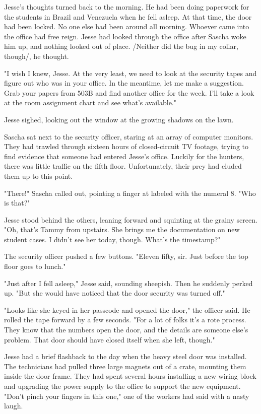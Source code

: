 Jesse's thoughts turned back to the morning.  He had been doing paperwork for the students in Brazil and Venezuela when he fell asleep.  At that time, the door had been locked.  No one else had been around all morning.  Whoever came into the office had free reign.  Jesse had looked through the office after Sascha woke him up, and nothing looked out of place.  /Neither did the bug in my collar, though/, he thought.

"I wish I knew, Jesse.  At the very least, we need to look at the security tapes and figure out who was in your office.  In the meantime, let me make a suggestion.  Grab your papers from 503B and find another office for the week.  I'll take a look at the room assignment chart and see what's available."

Jesse sighed, looking out the window at the growing shadows on the lawn.

				
Sascha sat next to the security officer, staring at an array of computer monitors.  They had trawled through sixteen hours of closed-circuit TV footage, trying to find evidence that someone had entered Jesse's office.  Luckily for the hunters, there was little traffic on the fifth floor.  Unfortunately, their prey had eluded them up to this point.

"There!" Sascha called out, pointing a finger at labeled with the numeral 8.  "Who is that?"

Jesse stood behind the others, leaning forward and squinting at the grainy screen.  "Oh, that's Tammy from upstairs.  She brings me the documentation on new student cases.  I didn't see her today, though.  What's the timestamp?"

The security officer pushed a few buttons.  "Eleven fifty, sir.  Just before the top floor goes to lunch."

"Just after I fell asleep," Jesse said, sounding sheepish.  Then he suddenly perked up.  "But she would have noticed that the door security was turned off."

"Looks like she keyed in her passcode and opened the door," the officer said.  He rolled the tape forward by a few seconds.  "For a lot of folks it's a rote process.  They know that the numbers open the door, and the details are someone else's problem.  That door should have closed itself when she left, though."

Jesse had a brief flashback to the day when the heavy steel door was installed.  The technicians had pulled three large magnets out of a crate, mounting them inside the door frame.  They had spent several hours installing a new wiring block and upgrading the power supply to the office to support the new equipment.  "Don't pinch your fingers in this one," one of the workers had said with a nasty laugh.

